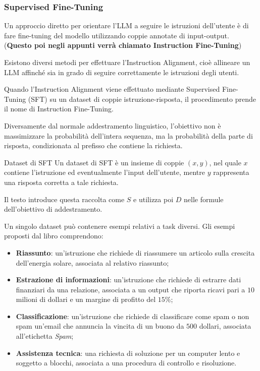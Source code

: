 \newpage

\subsubsection{Supervised Fine-Tuning}

Un approccio diretto per orientare l'LLM a seguire le istruzioni dell'utente è di fare fine-tuning del modello utilizzando coppie annotate di input-output. (\textbf{Questo poi negli appunti verrà chiamato Instruction Fine-Tuning})
\begin{observation}{}
    Esistono diversi metodi per effettuare l'Instruction Alignment, cioè allineare un LLM affinché sia in grado di seguire correttamente le istruzioni degli utenti.

    Quando l'Instruction Alignment viene effettuato mediante Supervised Fine-Tuning (SFT) su un dataset di coppie istruzione-risposta, il procedimento prende il nome di Instruction Fine-Tuning.
\end{observation}
Diversamente dal normale addestramento linguistico, l'obiettivo
non è massimizzare la probabilità dell'intera sequenza,
ma la probabilità della parte di risposta, condizionata
al prefisso che contiene la richiesta.

\begin{definition}{Dataset di SFT}
Un dataset di SFT è un insieme di coppie $(x,y)$, nel quale
$x$ contiene l'istruzione ed eventualmente l'input dell'utente,
mentre $y$ rappresenta una risposta corretta a tale richiesta.
\end{definition}

Il testo introduce questa raccolta come $S$ e utilizza poi
$D$ nelle formule dell'obiettivo di addestramento.

Un singolo dataset può contenere esempi relativi a task diversi.
Gli esempi proposti dal libro comprendono:

\begin{itemize}
    \item \textbf{Riassunto}: un'istruzione che richiede di
    riassumere un articolo sulla crescita dell'energia solare,
    associata al relativo riassunto;

    \item \textbf{Estrazione di informazioni}: un'istruzione
    che richiede di estrarre dati finanziari da una relazione,
    associata a un output che riporta ricavi pari a
    $10$ milioni di dollari e un margine di profitto del $15\%$;

    \item \textbf{Classificazione}: un'istruzione che richiede
    di classificare come spam o non spam un'email che annuncia
    la vincita di un buono da $500$ dollari,
    associata all'etichetta \emph{Spam};

    \item \textbf{Assistenza tecnica}: una richiesta di soluzione
    per un computer lento e soggetto a blocchi,
    associata a una procedura di controllo e risoluzione.
\end{itemize}

